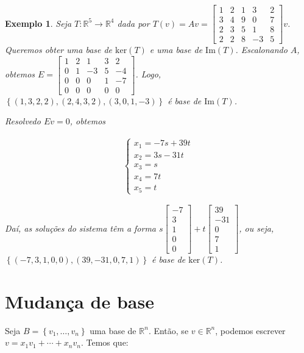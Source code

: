 \documentclass{article}
\newtheorem*{example}{Exemplo}
\begin{document}
\begin{example}
	Seja $T:\mathbb{R}^5\to\mathbb{R}^4$ dada por $T(v) = Av = \begin{bmatrix}
	1 & 2 & 1 & 3 & 2 \\
	3 & 4 & 9 & 0 & 7 \\
	2 & 3 & 5 & 1 & 8 \\
	2 & 2 & 8 & -3 & 5
	\end{bmatrix}v$. Queremos obter uma base de $\text{ker}(T)$ e uma base de $\text{Im}(T)$. Escalonando $A$, obtemos $E = \begin{bmatrix}
	1 & 2 & 1 & 3 & 2 \\
	0 & 1 & -3 & 5 & -4 \\
	0 & 0 & 0 & 1 & -7 \\
	0 & 0 & 0 & 0 & 0 
	\end{bmatrix}$. Logo, $\left\{(1,3,2,2),(2,4,3,2),(3,0,1,-3)\right\}$ é base de $\text{Im}(T)$.

\par\vspace{0.3cm} Resolvedo $Ev = 0$, obtemos

\begin{align*}
\begin{cases}
x_1 = -7s + 39t \\
x_2 = 3s - 31t \\
x_3 = s \\
x_4 = 7t \\
x_5 = t
\end{cases}
\end{align*}

\par\vspace{0.3cm} Daí, as soluções do sistema têm a forma $s\begin{bmatrix}
-7\\
3\\
1\\
0\\
0
\end{bmatrix} + t\begin{bmatrix}
39\\
-31\\
0\\
7\\
1
\end{bmatrix}$, ou seja, $\left\{ (-7,3,1,0,0), (39, -31, 0, 7, 1) \right\}$ é base de $\text{ker}(T)$.

\end{example}


\section{Mudança de base}
\hspace{12pt} Seja $B = \left\{ v_1, \dots, v_n \right\}$ uma base de $\mathbb{R}^n$. Então, se $v\in\mathbb{R}^n$, podemos escrever $v = x_1v_1 + \cdots + x_nv_n$. Temos que:
\end{document}
